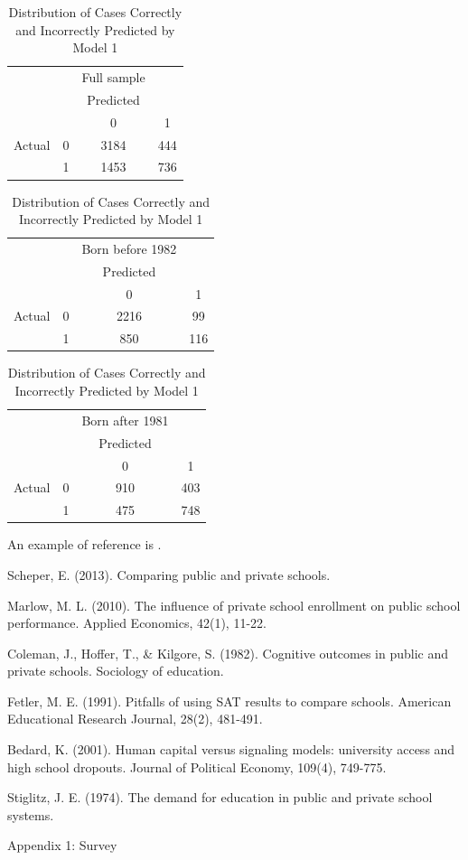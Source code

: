 \documentclass[12pt]{article}
\begin{document}
\begin{table}[ht]
\caption{Distribution of Cases Correctly and Incorrectly Predicted by Model 1}
\begin{center}
\begin{minipage}{2.5in}
\begin{tabular}{cccc}
&&Full sample&\\
&& Predicted\\
\hline
\hline
&&0&1\\
Actual&0&3184&444\\
&1&1453&736\\
\hline
\end{tabular}
\end{minipage}
\begin{minipage}{2.5in}
\begin{tabular}{cccc}
&&Born before 1982&\\
&& Predicted\\
\hline
\hline
&&0&1\\
Actual&0&2216&99\\
&1&850&116\\
\hline
\end{tabular}
\end{minipage}
\begin{minipage}{2.5in}
\begin{tabular}{cccc}
&&Born after 1981&\\
&& Predicted\\
\hline
\hline
&&0&1\\
Actual&0&910&403\\
&1&475&748\\
\hline
\end{tabular}
\end{minipage}
\end{center}
\label{actual}
\end{table}

An example of reference is \cite{abc}.

\newpage
\begin{thebibliography}{9}

Scheper, E. (2013). Comparing public and private schools.

Marlow, M. L. (2010). The influence of private school enrollment on public school performance. Applied Economics, 42(1), 11-22.

Coleman, J., Hoffer, T., \& Kilgore, S. (1982). Cognitive outcomes in public and private schools. Sociology of education.

Fetler, M. E. (1991). Pitfalls of using SAT results to compare schools. American Educational Research Journal, 28(2), 481-491.

Bedard, K. (2001). Human capital versus signaling models: university access and high school dropouts. Journal of Political Economy, 109(4), 749-775.

Stiglitz, J. E. (1974). The demand for education in public and private school systems.

\end{thebibliography}

\newpage
\listoffigures

\newpage
\listoftables

\newpage
Appendix 1: Survey


%
\end{document}
